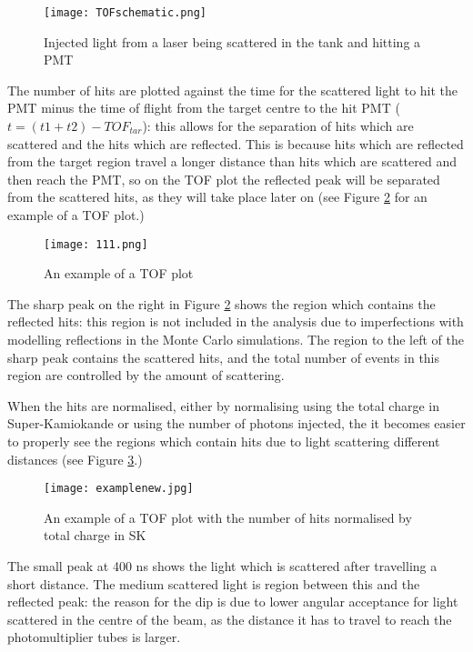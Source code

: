 \documentclass[11pt,oneside,a4paper]{article}
\begin{document}
\begin{figure}[htbp]
	\centering
	\texttt{[image: TOFschematic.png]}
	\caption{Injected light from a laser being scattered in the tank and hitting a PMT}
	\label{fig:TOFschematic}
\end{figure}

The number of hits are plotted against the time for the scattered light to hit the PMT minus the time of flight from the target centre to the hit PMT ($t=(t1+t2) - TOF_{tar}$): this allows for the separation of hits which are scattered and the hits which are reflected. This is because hits which are reflected from the target region travel a longer distance than hits which are scattered and then reach the PMT, so on the TOF plot the reflected peak will be separated from the scattered hits, as they will take place later on (see Figure \ref{fig:exampleTOF} for an example of a TOF plot.)
	
\begin{figure}[htbp]
	\centering
	\texttt{[image: 111.png]}
	\caption{An example of a TOF plot}
	\label{fig:exampleTOF}
\end{figure}	
	
The sharp peak on the right in Figure \ref{fig:exampleTOF} shows the region which contains the reflected hits: this region is not included in the analysis due to imperfections with modelling reflections in the Monte Carlo simulations. The region to the left of the sharp peak contains the scattered hits, and the total number of events in this region are controlled by the amount of scattering. 

When the hits are normalised, either by normalising using the total charge in Super-Kamiokande or using the number of photons injected, the it becomes easier to properly see the regions which contain hits due to light scattering different distances (see Figure \ref{fig:TOFnormalised}.)
	
\begin{figure}[htbp]
	\centering
	\texttt{[image: examplenew.jpg]}
	\caption{An example of a TOF plot with the number of hits normalised by total charge in SK}
	\label{fig:TOFnormalised}
\end{figure}

The small peak at 400 ns shows the light which is scattered after travelling a short distance. The medium scattered light is region between this and the reflected peak: the reason for the dip is due to lower angular acceptance for light scattered in the centre of the beam, as the distance it has to travel to reach the photomultiplier tubes is larger. 
	
\end{document}
